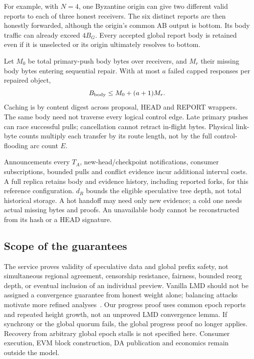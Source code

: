 \documentclass[11pt,a4paper,onecolumn]{article}
\theoremstyle{remark}\newtheorem{example}[definition]{Example}
\begin{document}
For example, with $N=4$, one Byzantine origin can give two different valid
reports to each of three honest receivers. The six distinct reports are then
honestly forwarded, although the origin's common AB output is bottom. Its
body traffic can already exceed $4B_G$. Every accepted global report body is
retained even if it is unselected or its origin ultimately resolves to bottom.

Let $M_0$ be total primary-push body bytes over receivers, and $M_r$ their
missing body bytes entering sequential repair. With at most $a$ failed capped
responses per repaired object,
\[
 B_{\rm body}\leq M_0+(a+1)M_r.
\]
Caching is by content digest across proposal, HEAD and REPORT wrappers. The
same body need not traverse every logical control edge. Late primary pushes
can race successful pulls; cancellation cannot retract in-flight bytes.
Physical link-byte counts multiply each transfer by its route length, not by
the full control-flooding arc count $E$.

Announcements every $T_A$, new-head/checkpoint notifications, consumer
subscriptions, bounded pulls and conflict evidence incur additional interval
costs. A full replica retains body and evidence history, including reported
forks, for this reference configuration. $d_R$ bounds the eligible speculative
tree depth, not total historical storage. A hot handoff may need only new
evidence; a cold one needs actual missing bytes and proofs. An unavailable
body cannot be reconstructed from its hash or a HEAD signature.

\subsection{Scope of the guarantees}
The service proves validity of speculative data and global prefix safety,
not simultaneous regional agreement, censorship resistance, fairness, bounded
reorg depth, or eventual inclusion of an individual preview. Vanilla LMD
should not be assigned a convergence guarantee from honest weight alone;
balancing attacks motivate more refined analyses~\cite{ebbflow}.
Our progress proof uses common epoch reports and repeated height growth,
not an unproved LMD convergence lemma. If synchrony or the global quorum fails,
the global progress proof no longer applies. Recovery from arbitrary global
epoch stalls is not specified here. Consumer execution, EVM block construction,
DA publication and economics remain outside the model.
\end{document}

